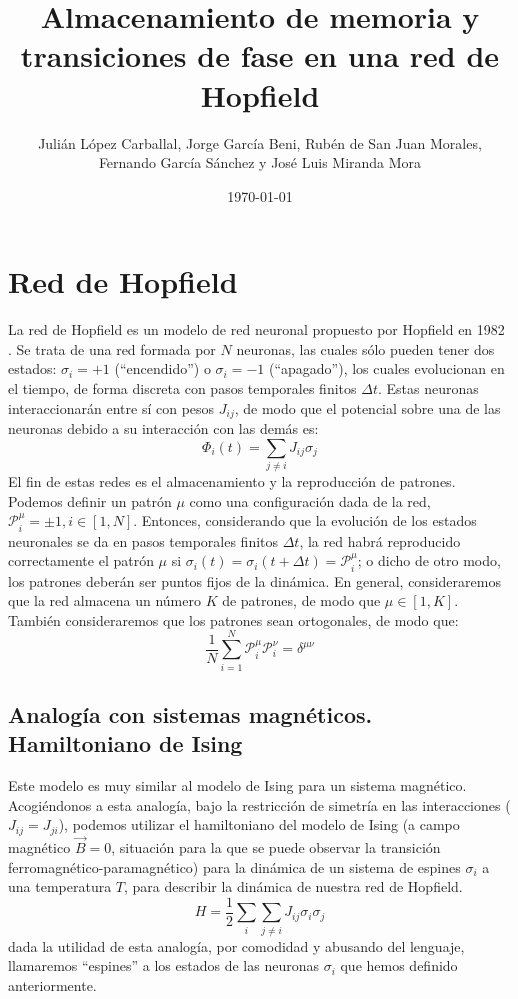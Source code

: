 \documentclass[titlepage,12pt]{article}
\title{\textbf{Almacenamiento de memoria y transiciones de fase en una red de Hopfield}}
\author{Julián López Carballal, Jorge García Beni, Rubén de San Juan Morales, Fernando García Sánchez y José Luis Miranda Mora}
\date{\today}
\numberwithin{equation}{section}
\begin{document}
	\maketitle
	\fontsize{15pt}{0}\tableofcontents
	\newpage
	
	
	\section{Red de Hopfield}
	\fontsize{12pt}{0}
	La red de Hopfield es un modelo de red neuronal propuesto por Hopfield en 1982 \cite{hopfield82}. Se trata de una red formada por $N$ neuronas, las cuales sólo pueden tener dos estados: $\sigma_i = +1$ (``encendido'') o $\sigma_i=-1$ (``apagado''), los cuales evolucionan en el tiempo, de forma discreta con pasos temporales finitos $\Delta t$. Estas neuronas interaccionarán entre sí con pesos $J_{ij}$, de modo que el potencial sobre una de las neuronas debido a su interacción con las demás es:
	\begin{displaymath}
	\Phi_i(t)=\sum_{j\neq i} J_{ij}\sigma_j
	\end{displaymath}
	El fin de estas redes es el almacenamiento y la reproducción de patrones. Podemos definir un patrón $\mu$ como una configuración dada de la red, $\mathcal{P}^\mu_i = \pm1, i \in[1,N]$. Entonces, considerando que la evolución de los estados neuronales se da en pasos temporales finitos $\Delta t$, la red habrá reproducido correctamente el patrón $\mu$ si $\sigma_i(t)=\sigma_i(t+\Delta t)=\mathcal{P}^\mu_i$; o dicho de otro modo, los patrones deberán ser puntos fijos de la dinámica. En general, consideraremos que la red almacena un número $K$ de patrones, de modo que $\mu\in[1,K]$. También consideraremos que los patrones sean ortogonales, de modo que:
	\begin{equation}
	\frac{1}{N}\sum_{i=1}^N \mathcal{P}^\mu_i \mathcal{P}^\nu_i = \delta^{\mu\nu}
	\label{ortpat}
	\end{equation}
	\subsection{Analogía con sistemas magnéticos. Hamiltoniano de Ising}
	Este modelo es muy similar al modelo de Ising para un sistema magnético. Acogiéndonos a esta analogía, bajo la restricción de simetría en las interacciones ($J_{ij}=J_{ji}$), podemos utilizar el hamiltoniano del modelo de Ising (a campo magnético $\vec{B}=0$, situación para la que se puede observar la transición ferromagnético-paramagnético) para la dinámica de un sistema de espines $\sigma_i$ a una temperatura $T$, para describir la dinámica de nuestra red de Hopfield.
	\begin{equation}
	H = \frac{1}{2}\sum_{i}\sum_{j\neq i}J_{ij}\sigma_i\sigma_j
	\label{HIsing}
	\end{equation}
	dada la utilidad de esta analogía, por comodidad y abusando del lenguaje, llamaremos ``espines'' a los estados de las neuronas $\sigma_i$ que hemos definido anteriormente. 
\end{document}
